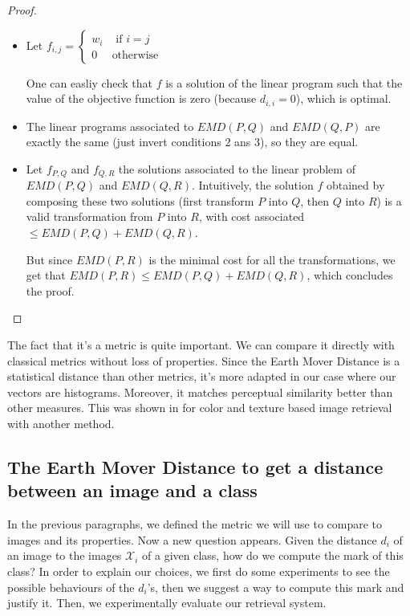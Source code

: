 \begin{proof}

\begin{itemize}
	\item Let $f_{i,j} = \begin{cases}
                        	w_i & \text{ if } i = j\\ 
                       	 	0 & \text{otherwise}
                   	 	 \end{cases}$
	
	One can easliy check that $f$ is a solution of the linear program such that the value of the objective function is zero (because $d_{i,i} = 0$), which is optimal.

	\item The linear programs associated to $EMD(P,Q)$ and $EMD(Q,P)$ are exactly the same (just invert conditions $2$ ans $3$), so they are equal.

	\item Let $f_{P,Q}$ and $f_{Q,R}$ the solutions associated to the linear problem of $EMD(P,Q)$ and $EMD(Q,R)$. Intuitively, the solution $f$ obtained by composing these two solutions (first transform $P$ into $Q$, then $Q$ into $R$) is a valid transformation from $P$ into $R$, with cost associated $\leq EMD(P,Q)+EMD(Q,R)$. 

	But since $EMD(P,R)$ is the minimal cost for all the transformations, we get that $EMD(P,R) \leq EMD(P,Q) + EMD(Q,R)$, which concludes the proof.
\end{itemize}

\end{proof}

The fact that it's a metric is quite important. We can compare it directly with classical metrics without loss of properties. Since the Earth Mover Distance is a statistical distance than other metrics, it's more adapted in our case where our vectors are histograms. Moreover, it matches perceptual similarity better than other measures. This was shown in \cite{EMD-use} for color and texture based image retrieval with another method.

\subsection{The Earth Mover Distance to get a distance between an image and a class}

In the previous paragraphs, we defined the metric we will use to compare to images and its properties. Now a new question appears. Given the distance $d_i$ of an image to the images $\mathcal{X}_i$ of a given class, how do we compute the mark of this class? In order to explain our choices, we first do some experiments to see the possible behaviours of the $d_i$'s, then we suggest a way to compute this mark and justify it. Then, we experimentally evaluate our retrieval system.

